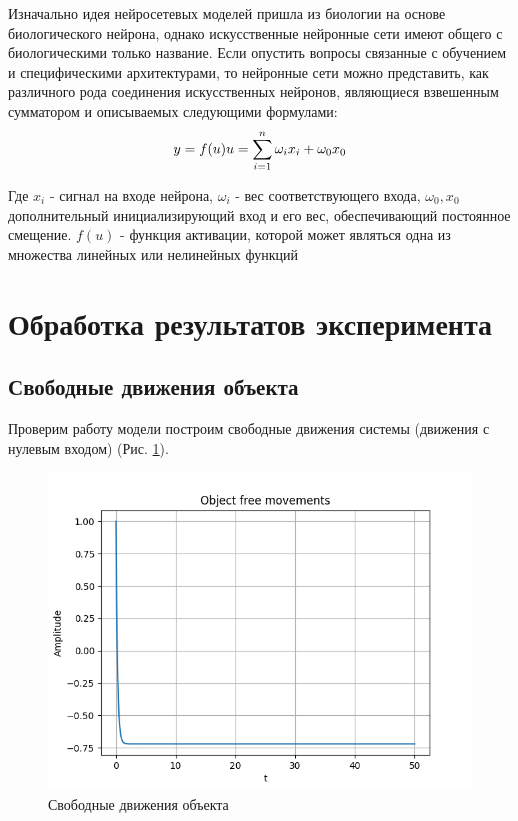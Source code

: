 Изначально идея нейросетевых моделей пришла из биологии на основе биологического нейрона, однако искусственные нейронные сети имеют общего с биологическими только название. Если опустить вопросы связанные с обучением и специфическими архитектурами, то нейронные сети можно представить, как различного рода соединения искусственных нейронов, являющиеся взвешенным сумматором и описываемых следующими формулами:
$$
y = f(u) \\
u = \sum_{i=1}^{n}  \omega_i x_i + \omega_0 x_0
$$

Где $x_i$ - сигнал на входе нейрона, $\omega_i$ - вес соответствующего входа, $\omega_0, x_0$ дополнительный инициализирующий вход и его вес, обеспечивающий постоянное смещение. $f(u)$ - функция активации, которой может являться одна из множества линейных или нелинейных функций

\section{Обработка результатов эксперимента}

\subsection{Свободные движения объекта}
Проверим работу модели построим свободные движения системы (движения с нулевым входом) (Рис. \ref{fig:1}).

\begin{figure}[H]
	\centering
	\includegraphics[width=0.9\linewidth]{body/images/Object-free-movements.png}
	\caption{Свободные движения объекта}
	\label{fig:1}
\end{figure}


